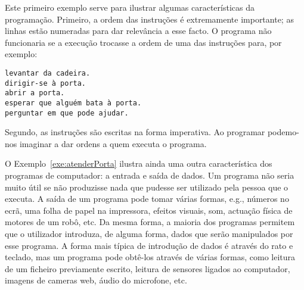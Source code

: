 Este primeiro exemplo serve para ilustrar algumas características da programação.
Primeiro, a ordem das instruções é extremamente importante; as linhas estão numeradas para dar relevância a esse facto. O programa não funcionaria se a execução trocasse a ordem de uma das instruções para, por exemplo:

\begin{lstlisting}[caption=Programa ``Atender a porta'' com instrução trocada, label=exe:atenderPortaOrdemTrocada]
levantar da cadeira.
dirigir-se à porta.
abrir a porta.
esperar que alguém bata à porta.
perguntar em que pode ajudar.
\end{lstlisting}

Segundo, as instruções são escritas na forma imperativa. Ao programar podemo-nos imaginar a dar ordens a quem executa o programa.

O Exemplo~\ref{exe:atenderPorta} ilustra ainda uma outra característica dos programas de computador: a entrada e saída de dados. Um programa não seria muito útil se não produzisse nada que pudesse ser utilizado pela pessoa que o executa. A saída de um programa pode tomar várias formas, e.g., números no ecrã, uma folha de papel na impressora, efeitos visuais, som, actuação física de motores de um robô, etc. Da mesma forma, a maioria dos programas permitem que o utilizador introduza, de alguma forma, dados que serão manipulados por esse programa. A forma mais típica de introdução de dados é através do rato e teclado, mas um programa pode obtê-los através de várias formas, como leitura de um ficheiro previamente escrito, leitura de sensores ligados ao computador, imagens de cameras web, áudio do microfone, etc. 






